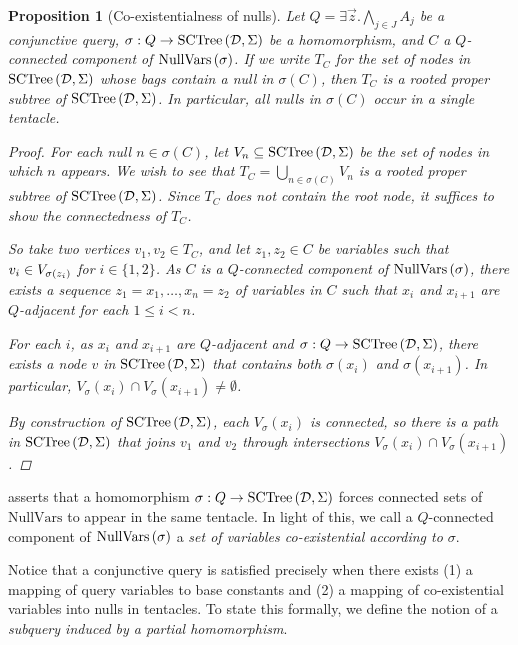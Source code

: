 \documentclass[12pt]{report}
\theoremstyle{plain}
\newtheorem{proposition}[theorem]{Proposition}
\theoremstyle{definition}
\newcommand{\NullVars}[1]{\ensuremath{\normalfont{\textrm{NullVars}} \left( #1 \right)}}
\newcommand{\SCTree}[2]{\ensuremath{\normalfont{\textrm{SCTree}} \left( #1, #2 \right)}}
\begin{document}
\begin{proposition}[Co-existentialness of nulls]
\label{coexistentialness}
  Let $Q = \exists \vec{z}. \bigwedge_{j \in J} A_j$ be a conjunctive query, $\sigma: Q \rightarrow \SCTree{\mathcal{D}}{\Sigma}$ be a homomorphism, and $C$ a $Q$-connected component of $\NullVars{\sigma}$. If we write $T_C$ for the set of nodes in $\SCTree{\mathcal{D}}{\Sigma}$ whose bags contain a null in $\sigma(C)$, then $T_C$ is a rooted proper subtree of $\SCTree{\mathcal{D}}{\Sigma}$. In particular, all nulls in $\sigma(C)$ occur in a single tentacle.
  \begin{proof}
    For each null $n \in \sigma(C)$, let $V_n \subseteq \SCTree{\mathcal{D}}{\Sigma}$ be the set of nodes in which $n$ appears. We wish to see that $T_C = \bigcup_{n \in \sigma(C)} V_n$ is a rooted proper subtree of $\SCTree{\mathcal{D}}{\Sigma}$. Since $T_C$ does not contain the root node, it suffices to show the connectedness of $T_C$.

    So take two vertices $v_1, v_2 \in T_C$, and let $z_1, z_2 \in C$ be variables such that $v_i \in\nobreak V_{\sigma(z_i)}$ for $i \in \{1, 2\}$. As $C$ is a $Q$-connected component of $\NullVars{\sigma}$, there exists a sequence $z_1 = x_1, \ldots, x_n = z_2$ of variables in $C$ such that $x_i$ and $x_{i+1}$ are $Q$-adjacent for each $1 \leq i < n$.

    For each $i$, as $x_i$ and $x_{i+1}$ are $Q$-adjacent and $\sigma: Q \rightarrow \SCTree{\mathcal{D}}{\Sigma}$, there exists a node $v$ in $\SCTree{\mathcal{D}}{\Sigma}$ that contains both $\sigma(x_i)$ and $\sigma(x_{i+1})$. In particular, $V_\sigma(x_i) \cap V_\sigma(x_{i+1}) \neq \emptyset$.

    By construction of $\SCTree{\mathcal{D}}{\Sigma}$, each $V_\sigma(x_i)$ is connected, so there is a path in $\SCTree{\mathcal{D}}{\Sigma}$ that joins $v_1$ and $v_2$ through intersections $V_\sigma(x_i) \cap V_\sigma(x_{i+1})$.
  \end{proof}
\end{proposition}

 asserts that a homomorphism $\sigma: Q \rightarrow \SCTree{\mathcal{D}}{\Sigma}$ forces connected sets of $\textrm{NullVars}$ to appear in the same tentacle. In light of this, we call a $Q$-connected component of $\NullVars{\sigma}$ a \emph{set of variables co-existential according to $\sigma$}.

Notice that a conjunctive query is satisfied precisely when there exists (1) a mapping of query variables to base constants and (2) a mapping of co-existential variables into nulls in tentacles. To state this formally, we define the notion of a \emph{subquery induced by a partial homomorphism}.
\end{document}
